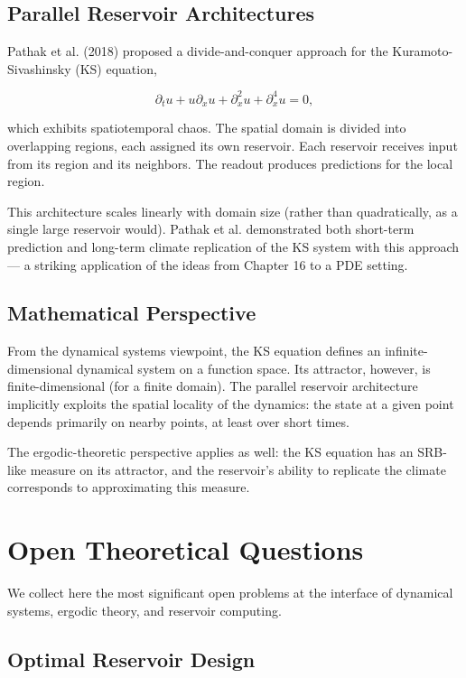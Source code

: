\subsection{Parallel Reservoir Architectures}\label{sec:17.7.1}

Pathak et al. (2018) proposed a divide-and-conquer approach for the Kuramoto-Sivashinsky (KS) equation,

\[
\partial_t u + u\partial_x u + \partial_x^2 u + \partial_x^4 u = 0,
\]

which exhibits spatiotemporal chaos. The spatial domain is divided into overlapping regions, each assigned its own reservoir. Each reservoir receives input from its region and its neighbors. The readout produces predictions for the local region.

This architecture scales linearly with domain size (rather than quadratically, as a single large reservoir would). Pathak et al. demonstrated both short-term prediction and long-term climate replication of the KS system with this approach --- a striking application of the ideas from Chapter 16 to a PDE setting.

\subsection{Mathematical Perspective}\label{sec:17.7.2}

From the dynamical systems viewpoint, the KS equation defines an infinite-dimensional dynamical system on a function space. Its attractor, however, is finite-dimensional (for a finite domain). The parallel reservoir architecture implicitly exploits the spatial locality of the dynamics: the state at a given point depends primarily on nearby points, at least over short times.

The ergodic-theoretic perspective applies as well: the KS equation has an SRB-like measure on its attractor, and the reservoir's ability to replicate the climate corresponds to approximating this measure.


\bigskip


\section{Open Theoretical Questions}\label{sec:17.8}

We collect here the most significant open problems at the interface of dynamical systems, ergodic theory, and reservoir computing.

\subsection{Optimal Reservoir Design}\label{sec:17.8.1}

